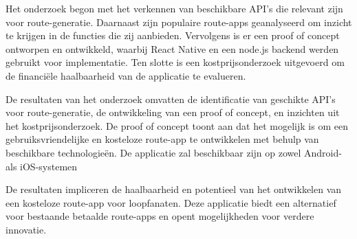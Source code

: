 Het onderzoek begon met het verkennen van beschikbare API's die relevant zijn voor route-generatie. Daarnaast zijn populaire route-apps geanalyseerd om inzicht te krijgen in de functies die zij aanbieden. 
Vervolgens is er een proof of concept ontworpen en ontwikkeld, waarbij React Native en een node.js backend werden gebruikt voor implementatie. 
Ten slotte is een kostprijsonderzoek uitgevoerd om de financiële haalbaarheid van de applicatie te evalueren.

De resultaten van het onderzoek omvatten de identificatie van geschikte API's voor route-generatie, de ontwikkeling van een proof of concept, en inzichten uit het kostprijsonderzoek. 
De proof of concept toont aan dat het mogelijk is om een gebruiksvriendelijke en kosteloze route-app te ontwikkelen met behulp van beschikbare technologieën.
De applicatie zal beschikbaar zijn op zowel Android- als iOS-systemen

De resultaten impliceren de haalbaarheid en potentieel van het ontwikkelen van een kosteloze route-app voor loopfanaten. 
Deze applicatie biedt een alternatief voor bestaande betaalde route-apps en opent mogelijkheden voor verdere innovatie. 

